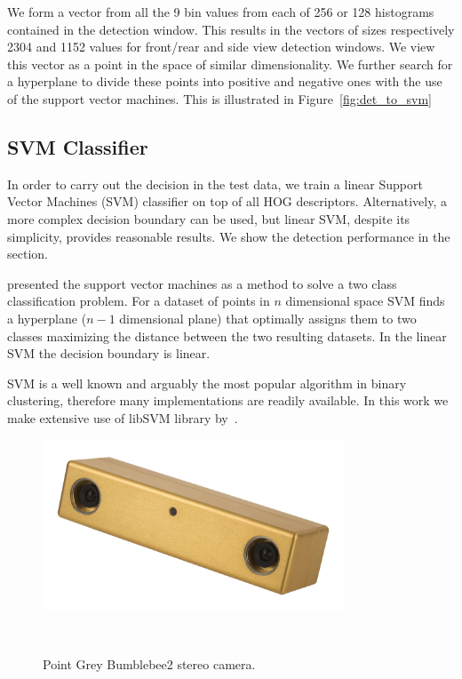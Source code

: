 We form a vector from all the 9 bin values from each of 256 or 128 histograms
contained in the detection window. This results in the vectors of sizes
respectively 2304 and 1152 values for front/rear and side view detection
windows. We view this vector as a point in the space of similar
dimensionality. We further search for a hyperplane to divide these points into
positive and negative ones with the use of the support vector machines. This
is illustrated in Figure~\ref{fig:det_to_svm}


\subsection{SVM Classifier}\label{sub:svm_classifier}

In order to carry out the decision in the test data, we train a linear Support
Vector Machines (SVM) classifier on top of all HOG descriptors. Alternatively,
a more complex decision boundary can be used, but linear SVM, despite its
simplicity, provides reasonable results. We show the detection performance in
the  section.

\citet{svm} presented the support vector machines as a method to solve a two
class classification problem. For a dataset of points in $n$ dimensional space
SVM finds a hyperplane ($n-1$ dimensional plane) that optimally assigns them
to two classes maximizing the distance between the two resulting datasets. In
the linear SVM the decision boundary is linear.

SVM is a well known and arguably the most popular algorithm in binary
clustering, therefore many implementations are readily available. In this work
we make extensive use of libSVM library by~\citet{libSVM2011}.

\begin{figure}
\begin{center}
\includegraphics[width=0.8\textwidth]{pictures/bumblebee.jpg}
\end{center}
\vspace{-20pt}
\caption{Point Grey Bumblebee2 stereo camera.}\
\vspace{-10pt}
\label{fig:bumblebee}
\end{figure}


